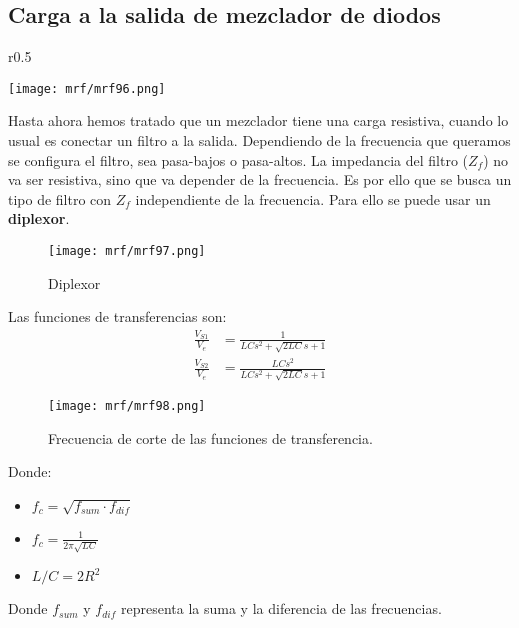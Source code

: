 \documentclass[
	12pt, %
	fleqn, %
	a4paper, %
	oneside, %
]{LegrandOrangeBook}
\begin{document}
\subsection{Carga a la salida de mezclador de diodos}
\begin{wrapfigure}{r}{0.5\linewidth}
  \begin{center}
    \texttt{[image: mrf/mrf96.png]}
  \end{center}
  \caption{}
\end{wrapfigure}
Hasta ahora hemos tratado que un mezclador tiene una carga resistiva, cuando lo usual es conectar un filtro a la salida. Dependiendo de la frecuencia que queramos se configura el filtro, sea pasa-bajos o pasa-altos. La impedancia del filtro ($Z_f$) no va ser resistiva, sino que va depender de la frecuencia. Es por ello que se busca un tipo de filtro con $Z_f$ independiente de la frecuencia. Para ello se puede usar un \textbf{diplexor}.
\begin{figure}[H]
\centering
\texttt{[image: mrf/mrf97.png]}
\caption{Diplexor}
\end{figure}
Las funciones de transferencias son:
\begin{align}
\frac{V_{S1}}{V_e}&=\frac{1}{LCs^2+\sqrt{2LC}s+1}\\
\frac{V_{S2}}{V_e}&=\frac{LCs^2}{LCs^2+\sqrt{2LC}s+1}
\end{align}
\begin{figure}[H]
\centering
\texttt{[image: mrf/mrf98.png]}
\caption{Frecuencia de corte de las funciones de transferencia.}
\end{figure}
Donde:
\begin{itemize}
\item $f_c=\sqrt{f_{sum}\cdot f_{dif}}$
\item $f_c=\frac{1}{2\pi\sqrt{LC}}$
\item $L/C=2R^2$
\end{itemize}
\begin{notation}
Donde $f_{sum}$ y $f_{dif}$ representa la suma y la diferencia de las frecuencias.
\end{notation}
\end{document}
